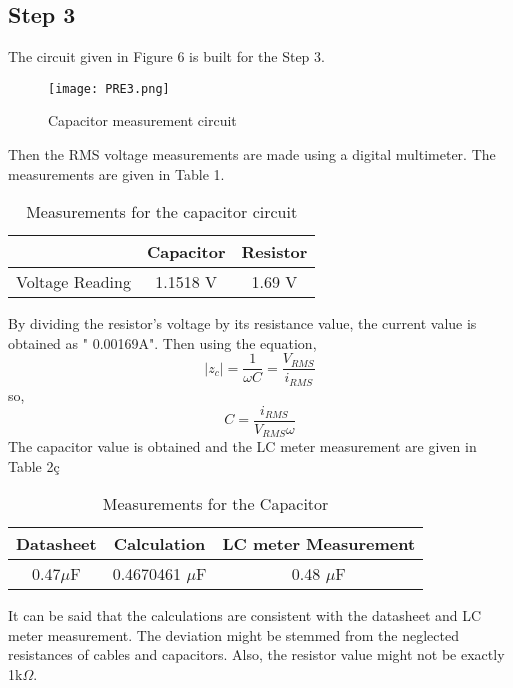 \documentclass[letterpaper,12pt]{article}
\begin{document}
\subsection{Step 3}
The circuit given in Figure 6 is built for the Step 3.
\begin{figure}[H]
	\centering
   \texttt{[image: PRE3.png]}
   \caption{Capacitor measurement circuit}
\end{figure}
Then the RMS voltage measurements are made using a digital multimeter. The measurements are given in Table 1.

\begin{table}[H]
	\begin{center}
		\caption{Measurements for the capacitor circuit}
		\vspace{2mm}
		\begin{tabular}{||c | c | c||} 
		 \hline
		   & Capacitor & Resistor \\ [0.5ex] 
		 \hline\hline
		 Voltage Reading & 1.1518 V & 1.69 V  \\ 
		 \hline
		\end{tabular}
\end{center}
\end{table}
By dividing the resistor's voltage by its resistance value, the current value is obtained as " 0.00169A".
Then using the equation,
\[|z_c| = \frac{1}{\omega C} = \frac{V_{RMS}}{i_{RMS}}\]
so,
\[C = \frac{i_{RMS}}{V_{RMS} \omega}
	\]
The capacitor value is obtained and the LC meter measurement are given in Table 2ç
\begin{table}[H]
	\begin{center}
		\caption{Measurements for the Capacitor}
		\vspace{2mm}
		\begin{tabular}{||c | c | c||} 
		 \hline
		   Datasheet & Calculation & LC meter Measurement \\ [0.5ex] 
		 \hline\hline
		 0.47\(\mu\)F & 0.4670461 \(\mu\)F & 0.48 \(\mu\)F  \\
		 \hline

		\end{tabular}
\end{center}
\end{table}
It can be said that the calculations are consistent with the datasheet and LC meter measurement. The deviation might be stemmed from the neglected resistances of cables and capacitors. Also, the resistor value might not be exactly 1k\(\Omega\).
\end{document}
